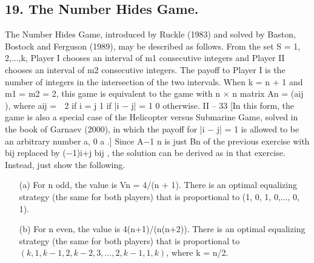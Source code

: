 \documentclass[]{report}
\begin{document}
\subsection{19. The Number Hides Game.} 
The Number Hides Game, introduced by Ruckle
(1983) and solved by Baston, Bostock and Ferguson (1989), may be described as follows.
From the set S = {1, 2,...,k}, Player I chooses an interval of m1 consecutive integers
and Player II chooses an interval of m2 consecutive integers. The payoff to Player I is
the number of integers in the intersection of the two intervals. When k = n + 1 and
m1 = m2 = 2, this game is equivalent to the game with n × n matrix An = (aij ), where
aij =
 2 if i = j
1 if |i − j| = 1
0 otherwise.
II – 33
[In this form, the game is also a special case of the Helicopter versus Submarine
Game, solved in the book of Garnaev (2000), in which the payoff for |i − j| = 1 is allowed
to be an arbitrary number a, 0 \leq a .] Since A−1 n is just Bn of the previous exercise
with bij replaced by (−1)i+j bij , the solution can be derived as in that exercise. Instead,
just show the following.
\begin{itemize}
\item[(a)] For n odd, the value is Vn = 4/(n + 1). There is an optimal equalizing strategy
(the same for both players) that is proportional to (1, 0, 1, 0,..., 0, 1).
\item[(b)] For n even, the value is 4(n+1)/(n(n+2)). There is an optimal equalizing strategy
(the same for both players) that is proportional to $(k, 1, k − 1, 2, k − 2, 3,..., 2, k − 1, 1, k)$,
where k = n/2.
\end{itemize}
\end{document}
